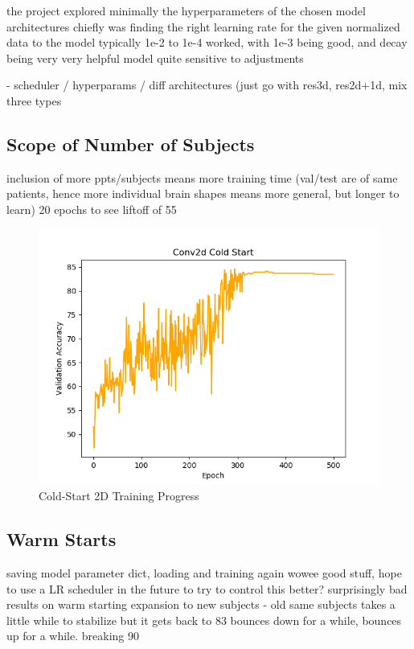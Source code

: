 \documentclass[10pt,twocolumn,letterpaper]{article}
\begin{document}
the project explored minimally the hyperparameters of the chosen model architectures
chiefly was finding the right learning rate for the given normalized data to the model
typically 1e-2 to 1e-4 worked, with 1e-3 being good, and decay being very very helpful
model quite sensitive to adjustments

- scheduler / hyperparams / diff architectures (just go with res3d, res2d+1d, mix three types

\subsection{Scope of Number of Subjects}\label{subsec:num-subjects}

inclusion of more ppts/subjects means more training time (val/test are of same patients,
hence more individual brain shapes means more general, but longer to learn)
20 epochs to see liftoff of 55%

 \begin{figure}
  \includegraphics[width=\linewidth]{images/2d_cold.png}
  \caption{Cold-Start 2D Training Progress}
  \label{fig:2d_cold}
\end{figure}

\subsection{Warm Starts}\label{subsec:warm-starts}
saving model parameter dict, loading and training again
wowee good stuff, hope to use a LR scheduler in the future to try to control this better?
surprisingly bad results on warm starting expansion to new subjects - old same subjects takes a little while to stabilize
but it gets back to 83%
bounces down for a while, bounces up for a while. breaking 90%
\end{document}
